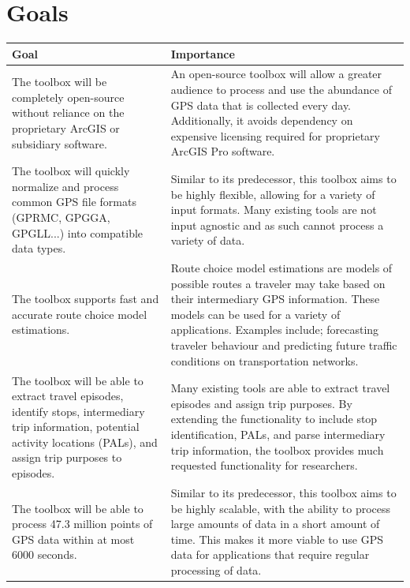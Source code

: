 \documentclass{article}
\begin{document}
\section{Goals}
\begin{table}[h!]
    \centering
        \begin{tabular}{|p{6cm}|p{6cm}|}
    		\hline
    		\textbf{Goal} & \textbf{Importance} \\
    		\hline
    		The toolbox will be completely open-source without reliance on the proprietary ArcGIS or subsidiary software. & An open-source toolbox will allow a greater audience to process and use the abundance of GPS data that is collected every day. Additionally, it avoids dependency on expensive licensing required for proprietary ArcGIS Pro software. \\
    		\hline
    		The toolbox will quickly normalize and process common GPS file formats (GPRMC, GPGGA, GPGLL...) into compatible data types. & Similar to its predecessor, this toolbox aims to be highly flexible, allowing for a variety of input formats. Many existing tools are not input agnostic and as such cannot process a variety of data.  \\
    		\hline
    		The toolbox supports fast and accurate route choice model estimations. & Route choice model estimations are models of possible routes a traveler may take based on their intermediary GPS information. These models can be used for a variety of applications. Examples include; forecasting traveler behaviour and predicting future traffic conditions on transportation networks. \\
    		\hline
    		The toolbox will be able to extract travel episodes, identify stops, intermediary trip information, potential activity locations (PALs), and assign trip purposes to episodes. & Many existing tools are able to extract travel episodes and assign trip purposes. By extending the functionality to include stop identification, PALs, and parse intermediary trip information, the toolbox provides much requested functionality for researchers. \\
    		\hline
    		The toolbox will be able to process 47.3 million points of GPS data within at most 6000 seconds. & Similar to its predecessor, this toolbox aims to be highly scalable, with the ability to process large amounts of data in a short amount of time. This makes it more viable to use GPS data for applications that require regular processing of data.\\
    		\hline
    	\end{tabular}
		
\end{table}
\end{document}
